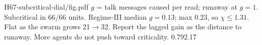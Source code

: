 {H67-subcritical-dial/fig.pdf}
{$g$ = talk messages caused per read; runaway at $g=1$.}
{Subcritical in 66/66 units. Regime-III median $g=0.13$; max 0.23, so $\chi\le1.31$. Flat as the swarm grows 21$\to$32.}
{Report the lagged gain as the distance to runaway. More agents do not push toward criticality.}
{0.79}{2.17}
